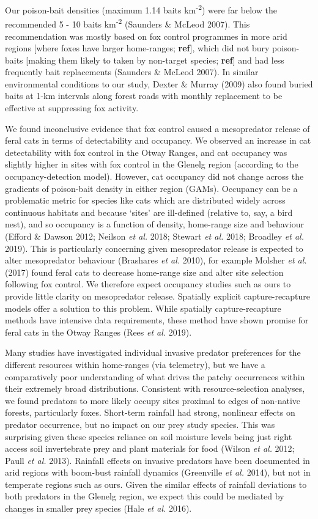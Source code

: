 \documentclass[11pt,a4paper,titlepage,twoside,openright]{style/unimelbthesis}
\begin{document}
\begin{mainmatter}
Our poison-bait densities (maximum 1.14 baits km\textsuperscript{-2}) were far below the recommended 5 - 10 baits km\textsuperscript{-2} (Saunders \& McLeod 2007). This recommendation was mostly based on fox control programmes in more arid regions {[}where foxes have larger home-ranges; \textbf{ref}{]}, which did not bury poison-baits {[}making them likely to taken by non-target species; \textbf{ref}{]} and had less frequently bait replacements (Saunders \& McLeod 2007). In similar environmental conditions to our study, Dexter \& Murray (2009) also found buried baits at 1-km intervals along forest roads with monthly replacement to be effective at suppressing fox activity.

We found inconclusive evidence that fox control caused a mesopredator release of feral cats in terms of detectability and occupancy. We observed an increase in cat detectability with fox control in the Otway Ranges, and cat occupancy was slightly higher in sites with fox control in the Glenelg region (according to the occupancy-detection model). However, cat occupancy did not change across the gradients of poison-bait density in either region (GAMs). Occupancy can be a problematic metric for species like cats which are distributed widely across continuous habitats and because `sites' are ill-defined (relative to, say, a bird nest), and so occupancy is a function of density, home-range size and behaviour (Efford \& Dawson 2012; Neilson \emph{et al.} 2018; Stewart \emph{et al.} 2018; Broadley \emph{et al.} 2019). This is particularly concerning given mesopredator release is expected to alter mesopredator behaviour (Brashares \emph{et al.} 2010), for example Molsher \emph{et al.} (2017) found feral cats to decrease home-range size and alter site selection following fox control. We therefore expect occupancy studies such as ours to provide little clarity on mesopredator release. Spatially explicit capture-recapture models offer a solution to this problem. While spatially capture-recapture methods have intensive data requirements, these method have shown promise for feral cats in the Otway Ranges (Rees \emph{et al.} 2019).

Many studies have investigated individual invasive predator preferences for the different resources within home-ranges (via telemetry), but we have a comparatively poor understanding of what drives the patchy occurrences within their extremely broad distributions. Consistent with resource-selection analyses, we found predators to more likely occupy sites proximal to edges of non-native forests, particularly foxes. Short-term rainfall had strong, nonlinear effects on predator occurrence, but no impact on our prey study species. This was surprising given these species reliance on soil moisture levels being just right access soil invertebrate prey and plant materials for food (Wilson \emph{et al.} 2012; Paull \emph{et al.} 2013). Rainfall effects on invasive predators have been documented in arid regions with boom-bust rainfall dynamics (Greenville \emph{et al.} 2014), but not in temperate regions such as ours. Given the similar effects of rainfall deviations to both predators in the Glenelg region, we expect this could be mediated by changes in smaller prey species (Hale \emph{et al.} 2016).


\end{mainmatter}
\end{document}
